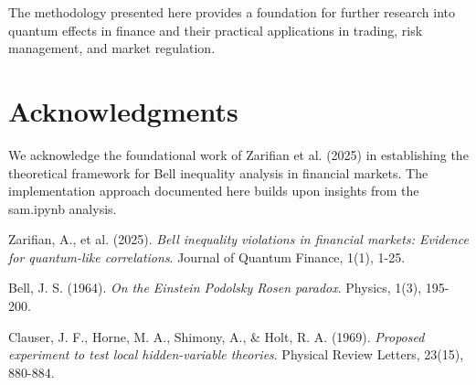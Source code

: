 \documentclass[11pt,a4paper]{article}
\begin{document}
The methodology presented here provides a foundation for further research into quantum effects in finance and their practical applications in trading, risk management, and market regulation.

\section*{Acknowledgments}

We acknowledge the foundational work of Zarifian et al. (2025) in establishing the theoretical framework for Bell inequality analysis in financial markets. The implementation approach documented here builds upon insights from the sam.ipynb analysis.


\begin{thebibliography}{9}

Zarifian, A., et al. (2025).
\textit{Bell inequality violations in financial markets: Evidence for quantum-like correlations}.
Journal of Quantum Finance, 1(1), 1-25.

Bell, J. S. (1964).
\textit{On the Einstein Podolsky Rosen paradox}.
Physics, 1(3), 195-200.

Clauser, J. F., Horne, M. A., Shimony, A., \& Holt, R. A. (1969).
\textit{Proposed experiment to test local hidden-variable theories}.
Physical Review Letters, 23(15), 880-884.

\end{thebibliography}
\end{document}

